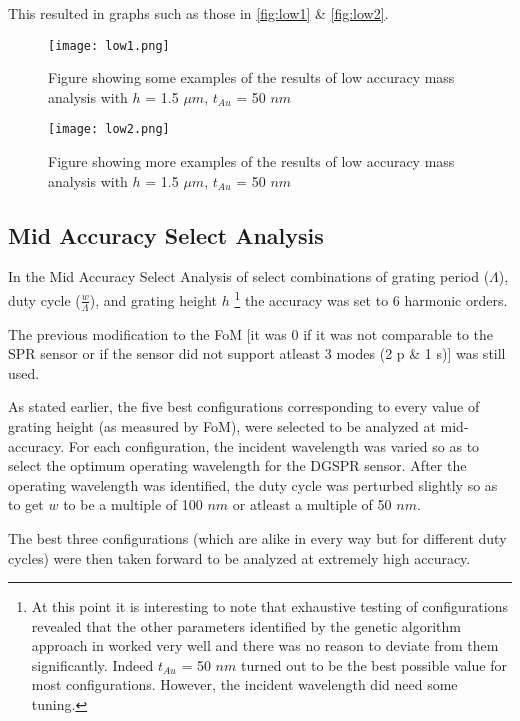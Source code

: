 This resulted in graphs such as those in \autoref{fig:low1} \& \autoref{fig:low2}.

\begin{figure}
\centering
\texttt{[image: low1.png]}
\caption{Figure showing some examples of the results of low accuracy mass analysis with $h$ = 1.5 $\mu m$, $t_{Au}$ = 50 $nm$}
\label{fig:low1}
\end{figure}

\begin{figure}
\centering
\texttt{[image: low2.png]}
\caption{Figure showing more examples of the results of low accuracy mass analysis with $h$ = 1.5 $\mu m$, $t_{Au}$ = 50 $nm$}
\label{fig:low2}
\end{figure}

\subsection{Mid Accuracy Select Analysis}

In the Mid Accuracy Select Analysis of select combinations of grating period ($\Lambda$), duty cycle ($\frac{w}{\Lambda}$), and grating height $h$ \footnote{At this point it is interesting to note that exhaustive testing of configurations revealed that the other parameters identified by the genetic algorithm approach in \cite{farshid_ol} worked very well and there was no reason to deviate from them significantly. Indeed $t_{Au}$ = 50 $nm$ turned out to be the best possible value for most configurations. However, the incident wavelength did need some tuning.} the accuracy was set to 6 harmonic orders. 

The previous modification to the FoM [it was 0 if it was not comparable to the SPR sensor or if the sensor did not support atleast 3 modes (2 p \& 1 s)] was still used.

As stated earlier, the five best configurations corresponding to every value of grating height (as measured by FoM), were selected to be analyzed at mid-accuracy. For each configuration, the incident wavelength was varied so as to select the optimum operating wavelength for the DGSPR sensor. After the operating wavelength was identified, the duty cycle was perturbed slightly so as to get $w$ to be a multiple of 100 $nm$ or atleast a multiple of 50 $nm$. 

The best three configurations (which are alike in every way but for different duty cycles) were then taken forward to be analyzed at extremely high accuracy. 

